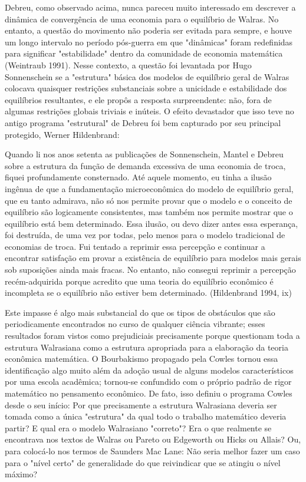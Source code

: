 \documentclass[12pt]{article}
\begin{document}
Debreu, como observado acima, nunca pareceu muito interessado em descrever a dinâmica de convergência de uma economia para o equilíbrio de Walras. No entanto, a questão do movimento não poderia ser evitada para sempre, e houve um longo intervalo no período pós-guerra em que "dinâmicas" foram redefinidas para significar "estabilidade" dentro da comunidade de economia matemática (Weintraub 1991). Nesse contexto, a questão foi levantada por Hugo Sonnenschein se a "estrutura" básica dos modelos de equilíbrio geral de Walras colocava quaisquer restrições substanciais sobre a unicidade e estabilidade dos equilíbrios resultantes, e ele propôs a resposta surpreendente: não, fora de algumas restrições globais triviais e inúteis. O efeito devastador que isso teve no antigo programa "estrutural" de Debreu foi bem capturado por seu principal protegido, Werner Hildenbrand:

Quando li nos anos setenta as publicações de Sonnenschein, Mantel e Debreu sobre a estrutura da função de demanda excessiva de uma economia de troca, fiquei profundamente consternado. Até aquele momento, eu tinha a ilusão ingênua de que a fundamentação microeconômica do modelo de equilíbrio geral, que eu tanto admirava, não só nos permite provar que o modelo e o conceito de equilíbrio são logicamente consistentes, mas também nos permite mostrar que o equilíbrio está bem determinado. Essa ilusão, ou devo dizer antes essa esperança, foi destruída, de uma vez por todas, pelo menos para o modelo tradicional de economias de troca. Fui tentado a reprimir essa percepção e continuar a encontrar satisfação em provar a existência de equilíbrio para modelos mais gerais sob suposições ainda mais fracas. No entanto, não consegui reprimir a percepção recém-adquirida porque acredito que uma teoria do equilíbrio econômico é incompleta se o equilíbrio não estiver bem determinado. (Hildenbrand 1994, ix)

Este impasse é algo mais substancial do que os tipos de obstáculos que são periodicamente encontrados no curso de qualquer ciência vibrante; esses resultados foram vistos como prejudiciais precisamente porque questionam toda a estrutura Walrasiana como a estrutura apropriada para a elaboração da teoria econômica matemática. O Bourbakismo propagado pela Cowles tornou essa identificação algo muito além da adoção usual de alguns modelos característicos por uma escola acadêmica; tornou-se confundido com o próprio padrão de rigor matemático no pensamento econômico. De fato, isso definiu o programa Cowles desde o seu início: Por que precisamente a estrutura Walrasiana deveria ser tomada como a única "estrutura" da qual todo o trabalho matemático deveria partir? E qual era o modelo Walrasiano "correto"? Era o que realmente se encontrava nos textos de Walras ou Pareto ou Edgeworth ou Hicks ou Allais? Ou, para colocá-lo nos termos de Saunders Mac Lane: Não seria melhor fazer um caso para o "nível certo" de generalidade do que reivindicar que se atingiu o nível máximo?
\end{document}
